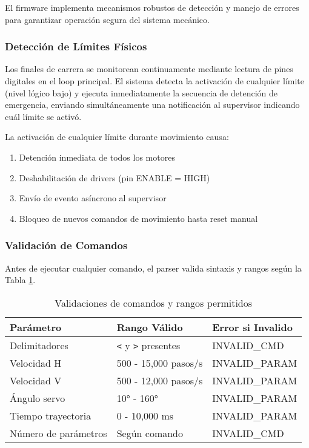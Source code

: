 El firmware implementa mecanismos robustos de detección y manejo de errores para garantizar operación segura del sistema mecánico.

\subsubsection{Detección de Límites Físicos}

Los finales de carrera se monitorean continuamente mediante lectura de pines digitales en el loop principal. El sistema detecta la activación de cualquier límite (nivel lógico bajo) y ejecuta inmediatamente la secuencia de detención de emergencia, enviando simultáneamente una notificación al supervisor indicando cuál límite se activó.

La activación de cualquier límite durante movimiento causa:
\begin{enumerate}
    \item Detención inmediata de todos los motores
    \item Deshabilitación de drivers (pin ENABLE = HIGH)
    \item Envío de evento asíncrono al supervisor
    \item Bloqueo de nuevos comandos de movimiento hasta reset manual
\end{enumerate}

\subsubsection{Validación de Comandos}

Antes de ejecutar cualquier comando, el parser valida sintaxis y rangos según la Tabla \ref{tab:validacion_comandos}.

\begin{table}[H]
\centering
\caption{Validaciones de comandos y rangos permitidos}
\label{tab:validacion_comandos}
\begin{tabular}{|l|l|l|}
\hline
\textbf{Parámetro} & \textbf{Rango Válido} & \textbf{Error si Invalido} \\
\hline
Delimitadores & \texttt{<} y \texttt{>} presentes & INVALID\_CMD \\
\hline
Velocidad H & 500 - 15,000 pasos/s & INVALID\_PARAM \\
\hline
Velocidad V & 500 - 12,000 pasos/s & INVALID\_PARAM \\
\hline
Ángulo servo & 10° - 160° & INVALID\_PARAM \\
\hline
Tiempo trayectoria & 0 - 10,000 ms & INVALID\_PARAM \\
\hline
Número de parámetros & Según comando & INVALID\_CMD \\
\hline
\end{tabular}
\end{table}

